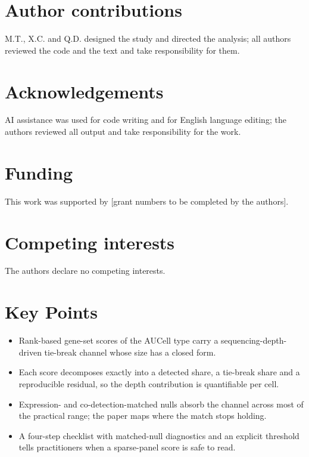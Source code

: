 \documentclass[11pt]{article}
\begin{document}
\section*{Author contributions}
M.T., X.C. and Q.D. designed the study and directed the analysis; all authors
reviewed the code and the text and take responsibility for them.

\section*{Acknowledgements}
AI assistance was used for code writing and for English language editing; the
authors reviewed all output and take responsibility for the work.

\section*{Funding}
This work was supported by [grant numbers to be completed by the authors].

\section*{Competing interests}
The authors declare no competing interests.

\section*{Key Points}
\begin{itemize}
\item Rank-based gene-set scores of the AUCell type carry a
sequencing-depth-driven tie-break channel whose size has a closed form.
\item Each score decomposes exactly into a detected share, a tie-break share
and a reproducible residual, so the depth contribution is quantifiable per
cell.
\item Expression- and co-detection-matched nulls absorb the channel across
most of the practical range; the paper maps where the match stops holding.
\item A four-step checklist with matched-null diagnostics and an explicit
threshold tells practitioners when a sparse-panel score is safe to read.
\end{itemize}




\clearpage
\appendix

\setcounter{table}{0}
\renewcommand{\thetable}{S\arabic{table}}
\renewcommand{\tablename}{Supplementary Table}
\end{document}
